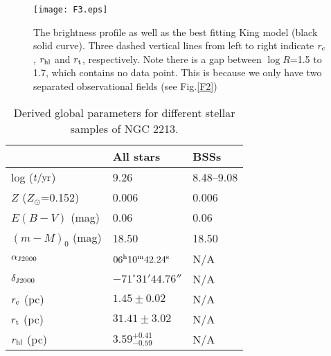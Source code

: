 \documentclass[useAMS,usenatbib,twocolumn]{mnras}
\begin{document}
\begin{figure*}
  \centering
  \texttt{[image: F3.eps]}
  \caption{The brightness profile as well as the best fitting King model (black solid curve). Three dashed vertical lines from left to right indicate $r_{\rm c}$, $r_{\rm hl}$ and $r_{\rm t}$, respectively. Note there is a gap between $\log{R}$=1.5 to 1.7, which contains no data point. This is because we only have two separated observational fields (see Fig.\ref{F2})}\label{F3}
\end{figure*}


\begin{table}
  \begin{center}
\caption{Derived global parameters for different stellar samples of NGC 2213.}\label{T1}
  \begin{tabular}{l l l}\hline
        &  All stars & BSSs\\\hline
   log ($t/{\rm yr}$) & 9.26 & 8.48--9.08 \\
$Z$ ($Z_{\odot}$=0.152) &0.006&0.006\\
$E(B-V)$ (mag) & 0.06 & 0.06 \\
$(m-M)_0$ (mag) & 18.50 & 18.50\\
$\alpha_{\rm J2000}$ & $06^{\rm h}10^{\rm m}42.24^{\rm s}$ & N/A\\
$\delta_{\rm J2000}$ & $-71^{\circ}31'44.76''$ & N/A\\
$r_{\rm c}$ (pc) & $1.45\pm0.02$ & N/A\\
$r_{\rm t}$ (pc) & $31.41\pm3.02$ & N/A\\
$r_{\rm hl}$ (pc) & $3.59^{+0.41}_{-0.59}$ & N/A\\\hline
  \end{tabular} 
  \end{center} 
\end{table} 
\end{document}
